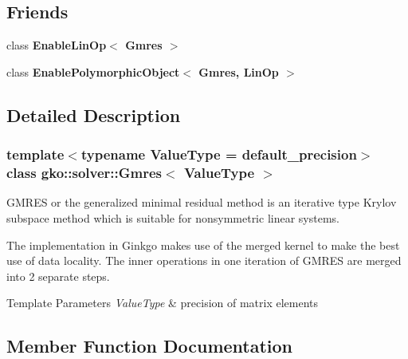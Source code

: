 \subsection*{Friends}
\begin{DoxyCompactItemize}
\item 
\mbox{\label{classgko_1_1solver_1_1Gmres_a3be7de14fce761042b534f3ef004d03f}} 
class {\bfseries Enable\+Lin\+Op$<$ Gmres $>$}
\item 
\mbox{\label{classgko_1_1solver_1_1Gmres_a8aceb23723f9e39e385a8192933e7cfc}} 
class {\bfseries Enable\+Polymorphic\+Object$<$ Gmres, Lin\+Op $>$}
\end{DoxyCompactItemize}


\subsection{Detailed Description}
\subsubsection*{template$<$typename Value\+Type = default\+\_\+precision$>$\newline
class gko\+::solver\+::\+Gmres$<$ Value\+Type $>$}

G\+M\+R\+ES or the generalized minimal residual method is an iterative type Krylov subspace method which is suitable for nonsymmetric linear systems. 

The implementation in Ginkgo makes use of the merged kernel to make the best use of data locality. The inner operations in one iteration of G\+M\+R\+ES are merged into 2 separate steps.


\begin{DoxyTemplParams}{Template Parameters}
{\em Value\+Type} & precision of matrix elements \\
\hline
\end{DoxyTemplParams}


\subsection{Member Function Documentation}
\mbox{\label{classgko_1_1solver_1_1Gmres_a3a808fe82cdd1e988667a89d6982e740}} 
